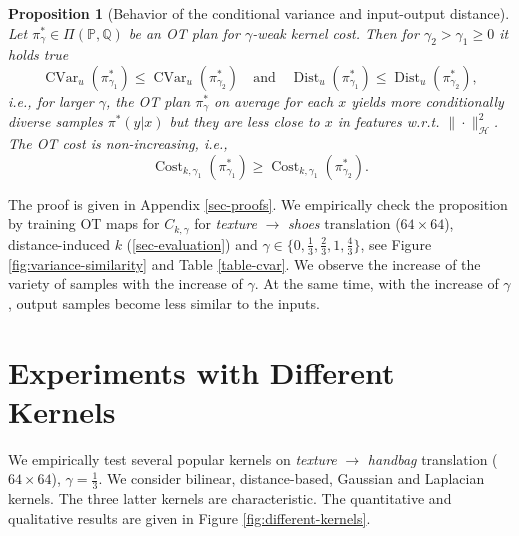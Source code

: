 \documentclass{article} %
\DeclareMathOperator{\CVar}{CVar}
\DeclareMathOperator{\Dist}{Dist}
\DeclareMathOperator{\Cost}{Cost}
\newtheorem{proposition}{Proposition}
\begin{document}
\begin{proposition}[Behavior of the conditional variance and input-output distance]

Let $\pi_{\gamma}^{*}\in\Pi(\mathbb{P},\mathbb{Q})$ be an OT plan for $\gamma$-weak kernel cost. Then for $\gamma_{2}>\gamma_{1}\geq 0$ it holds true
\begin{equation}
\CVar_{u}(\pi_{\gamma_{1}}^{*})\leq\CVar_{u}(\pi_{\gamma_{2}}^{*})\quad\text{and}\quad \Dist_{u}(\pi_{\gamma_{1}}^{*})\leq\Dist_{u}(\pi_{\gamma_{2}}^{*}),
\label{cvar-sim-behaviour}
\end{equation}
i.e., for larger $\gamma$, the OT plan $\pi^{*}_{\gamma}$ on average for each $x$ yields more conditionally diverse samples $\pi^{*}(y|x)$ but they are less close to $x$ in features w.r.t. $\|\cdot\|_{\mathcal{H}}^{2}$. The OT cost is non-increasing, i.e.,
\label{prop-var-sim}\begin{equation}
    \Cost_{k,\gamma_{1}}(\pi_{\gamma_{1}}^{*})\geq \Cost_{k,\gamma_{1}}(\pi_{\gamma_{2}}^{*}).
    \label{ot-cost-non-increasing}
\end{equation}\end{proposition}The proof is given in Appendix \ref{sec-proofs}. We empirically check the proposition by training OT maps for $C_{k,\gamma}$ for \textit{texture} $\rightarrow$ \textit{shoes} translation ($64\!\times\!64$), distance-induced $k$ (\wasyparagraph\ref{sec-evaluation}) and $\gamma\in\{0,\frac{1}{3},\frac{2}{3},1,\frac{4}{3}\}$, see Figure \ref{fig:variance-similarity} and Table \ref{table-cvar}. We observe the increase of the variety of samples with the increase of $\gamma$. At the same time, with the increase of $\gamma$, output samples become less similar to the inputs.

\vspace{-2mm}\section{Experiments with Different Kernels}
\label{sec-different-kernels}

We empirically test several popular kernels on \textit{texture} $\rightarrow$ \textit{handbag} translation ($64\!\times\!64$), $\gamma=\frac{1}{3}$. We consider bilinear, distance-based, Gaussian and Laplacian kernels. The three latter kernels are characteristic. The quantitative and qualitative results are given in Figure \ref{fig:different-kernels}.
\end{document}
